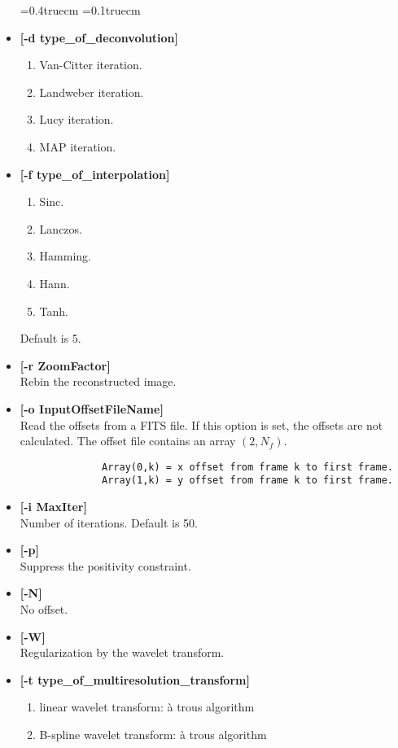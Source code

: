 \begin{itemize}     
\baselineskip=0.4truecm
\itemsep=0.1truecm
\item {\bf [-d type\_of\_deconvolution] }
\begin{enumerate}
\baselineskip=0.4truecm
\item Van-Citter iteration.
\item Landweber iteration.
\item Lucy iteration.
\item MAP iteration.
\end{enumerate} 
\item {\bf [-f type\_of\_interpolation] }
\begin{enumerate}
\baselineskip=0.4truecm
\itemsep=0.1truecm
\item  Sinc.
\item  Lanczos.
\item  Hamming.
\item  Hann.
\item  Tanh.
\end{enumerate} 
Default is 5.
\item {\bf [-r ZoomFactor]}  \\
Rebin the reconstructed image.
\item {\bf [-o InputOffsetFileName]}  \\
Read the offsets from a FITS file. If this option is set, the offsets are
not calculated.
The offset file contains an array $(2,N_f)$.
\begin{verbatim}
              Array(0,k) = x offset from frame k to first frame.
              Array(1,k) = y offset from frame k to first frame.
\end{verbatim}
\item {\bf [-i MaxIter]}  \\
 Number of iterations. Default is 50.
\item {\bf [-p]}  \\
Suppress the positivity constraint.
\item {\bf [-N]}  \\
No offset.
\item {\bf [-W]}  \\
Regularization by the wavelet transform.
\item {\bf [-t type\_of\_multiresolution\_transform]}
{\small 
\begin{enumerate}
\baselineskip=0.4truecm
\itemsep=0.1truecm\item linear wavelet transform: \`a trous algorithm 
\item B-spline wavelet transform: \`a trous algorithm 

\end{enumerate}}
\end{itemize}
